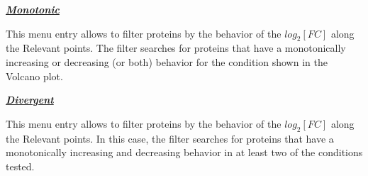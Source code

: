 \textbf{\textit{\underline{Monotonic}}}

This menu entry allows to filter proteins by the behavior of the $log_2[FC]$ along the Relevant points. The filter searches for proteins that have a monotonically increasing or decreasing (or both) behavior for the condition shown in the Volcano plot. 

\textbf{\textit{\underline{Divergent}}}

This menu entry allows to filter proteins by the behavior of the $log_2[FC]$ along the Relevant points. In this case, the filter searches for proteins that have a monotonically increasing and decreasing behavior in at least two of the conditions tested.




































